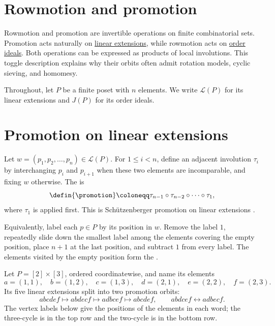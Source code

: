 
\section[rowmotionPromotion]{Rowmotion and promotion}

Rowmotion and promotion are invertible operations on finite combinatorial
sets.  Promotion acts naturally on
\hyperref[linearExtension]{linear extensions}, while rowmotion acts on
\hyperref[orderIdeal]{order ideals}.  Both operations can be expressed as
products of local involutions.  This toggle description explains why their
orbits often admit rotation models, cyclic sieving, and homomesy.

Throughout, let $P$ be a finite poset with $n$ elements.  We write
$\mathcal L(P)$ for its linear extensions and $J(P)$ for its order ideals.

\section[posetPromotion]{Promotion on linear extensions}

Let $w=(p_1,p_2,\dotsc,p_n)\in\mathcal L(P)$.  For $1\leq i<n$, define an
adjacent involution $\tau_i$ by interchanging $p_i$ and $p_{i+1}$ when these
two elements are incomparable, and fixing $w$ otherwise.  The
 is
\[
  \defin{\promotion}
  \coloneqq
  \tau_{n-1}\circ\tau_{n-2}\circ\dotsm\circ\tau_1,
\]
where $\tau_1$ is applied first.  This is Schützenberger promotion on linear
extensions \cite{Schutzenberger1972,Stanley2009}.

Equivalently, label each $p\in P$ by its position in $w$.  Remove the label
$1$, repeatedly slide down the smallest label among the elements covering
the empty position, place $n+1$ at the last position, and subtract $1$ from
every label.  The elements visited by the empty position form the
.

\begin{example*}
Let $P=[2]\times[3]$, ordered coordinatewise, and name its elements
\[
 a=(1,1),\quad b=(1,2),\quad c=(1,3),\quad
 d=(2,1),\quad e=(2,2),\quad f=(2,3).
\]
Its five linear extensions split into two promotion orbits:
\[
 abcdef\longmapsto abdecf\longmapsto adbcef\longmapsto abcdef,
 \qquad
 abdcef\longleftrightarrow adbecf.
\]
The vertex labels below give the positions of the elements in each word; the
three-cycle is in the top row and the two-cycle is in the bottom row.
\begin{figure}
\end{figure}
\end{example*}

